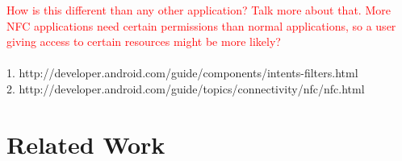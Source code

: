\documentclass[12pt]{article}
\newcommand\TODO[1]{\textcolor{red}{#1}}
\begin{document}
\TODO{How is this different than any other application? Talk more about that. More NFC applications need certain permissions than normal applications, so a user giving access to certain resources might be more likely?}
\\
\\
1. http://developer.android.com/guide/components/intents-filters.html
\\
2. http://developer.android.com/guide/topics/connectivity/nfc/nfc.html


\section{Related Work}
%
%
\end{document}
